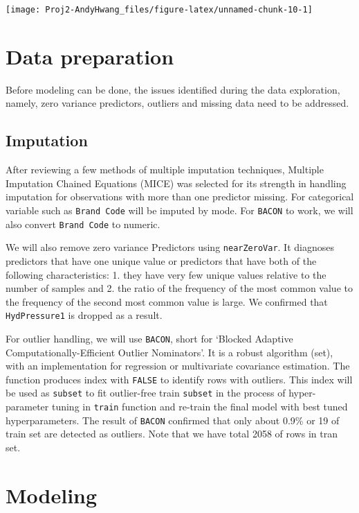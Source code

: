 \documentclass[]{report}
\begin{document}
\begin{center}\texttt{[image: Proj2-AndyHwang\_files/figure-latex/unnamed-chunk-10-1]} \end{center}

\chapter{Data preparation}\label{data-preparation}

Before modeling can be done, the issues identified during the data
exploration, namely, zero variance predictors, outliers and missing data
need to be addressed.

\section{Imputation}\label{imputation}

After reviewing a few methods of multiple imputation techniques,
Multiple Imputation Chained Equations (MICE) was selected for its
strength in handling imputation for observations with more than one
predictor missing. For categorical variable such as \texttt{Brand\ Code}
will be imputed by mode. For \texttt{BACON} to work, we will also
convert \texttt{Brand\ Code} to numeric.

We will also remove zero variance Predictors using \texttt{nearZeroVar}.
It diagnoses predictors that have one unique value or predictors that
have both of the following characteristics: 1. they have very few unique
values relative to the number of samples and 2. the ratio of the
frequency of the most common value to the frequency of the second most
common value is large. We confirmed that \texttt{HydPressure1} is
dropped as a result.

For outlier handling, we will use \texttt{BACON}, short for `Blocked
Adaptive Computationally-Efficient Outlier Nominators'. It is a robust
algorithm (set), with an implementation for regression or multivariate
covariance estimation. The function produces index with \texttt{FALSE}
to identify rows with outliers. This index will be used as
\texttt{subset} to fit outlier-free train \texttt{subset} in the process
of hyper-parameter tuning in \texttt{train} function and re-train the
final model with best tuned hyperparameters. The result of
\texttt{BACON} confirmed that only about 0.9\% or 19 of train set are
detected as outliers. Note that we have total 2058 of rows in tran set.

\chapter{Modeling}\label{modeling}
\end{document}
